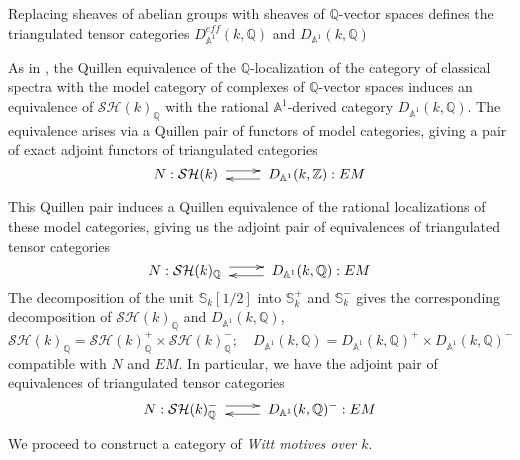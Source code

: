 \documentclass[a4paper,12pt,draft]{amsart}
\theoremstyle{definition}
\theoremstyle{remark}
\begin{document}
Replacing sheaves of abelian groups with sheaves of ${{\mathbb Q}}$-vector spaces defines the triangulated tensor categories $D_{{{\mathbb A}}^1}^{eff}(k,{{\mathbb Q}})$ and $D_{{{\mathbb A}}^1}(k,{{\mathbb Q}})$

As in \cite[\S 5.3.35]{CD}, the  Quillen equivalence of the ${{\mathbb Q}}$-localization of the  category of classical spectra with the model category of complexes of ${{\mathbb Q}}$-vector spaces induces an equivalence of ${\mathcal{SH}}(k)_{{\mathbb Q}}$ with the rational ${{\mathbb A}}^1$-derived category $D_{{{\mathbb A}}^1}(k,{{\mathbb Q}})$. The equivalence arises via a Quillen pair of functors of model categories, giving a pair of exact adjoint functors of triangulated categories
\[
N:{\mathcal{SH}}(k)\xymatrixrowsep{2pt}\xymatrix{\ar@<3pt>[r]&\ar@<3pt>[l]}D_{{{\mathbb A}}^1}(k,{{\mathbb Z}}):EM
\]

This Quillen pair induces a Quillen equivalence of the rational localizations of these model categories, giving us the adjoint pair of equivalences of triangulated tensor categories
\[
N:{\mathcal{SH}}(k)_{{\mathbb Q}}\xymatrixrowsep{2pt}\xymatrix{\ar@<3pt>[r]&\ar@<3pt>[l]}D_{{{\mathbb A}}^1}(k,{{\mathbb Q}}):EM
\]
The decomposition of the unit ${{\mathbb S}}_k[1/2]$ into ${{\mathbb S}}_k^+$ and ${{\mathbb S}}_k^-$ gives the corresponding decomposition of ${\mathcal{SH}}(k)_{{\mathbb Q}}$ and $D_{{{\mathbb A}}^1}(k,{{\mathbb Q}})$, 
\[
{\mathcal{SH}}(k)_{{\mathbb Q}}={\mathcal{SH}}(k)^+_{{\mathbb Q}}\times{\mathcal{SH}}(k)_{{\mathbb Q}}^-;\quad D_{{{\mathbb A}}^1}(k,{{\mathbb Q}})=D_{{{\mathbb A}}^1}(k,{{\mathbb Q}})^+\times D_{{{\mathbb A}}^1}(k,{{\mathbb Q}})^-
\]
compatible with $N$ and $EM$. In particular, we have the adjoint pair of equivalences of triangulated tensor categories
\begin{equation}\label{eqn:Equiv1}
N:{\mathcal{SH}}(k)^-_{{\mathbb Q}}\xymatrixrowsep{2pt}\xymatrix{\ar@<3pt>[r]&\ar@<3pt>[l]}D_{{{\mathbb A}}^1}(k,{{\mathbb Q}})^-:EM
\end{equation}

We proceed to construct a category of {\em Witt motives over $k$}.
\end{document}
